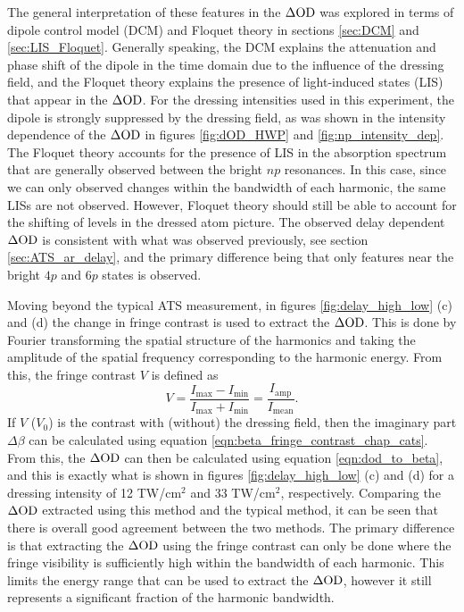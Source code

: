 The general interpretation of these features in the $\Delta\mathrm{OD}$ was explored in terms of dipole control model (DCM) and Floquet theory in sections \ref{sec:DCM} and \ref{sec:LIS_Floquet}.  Generally speaking, the DCM explains the attenuation and phase shift of the dipole in the time domain due to the influence of the dressing field, and the Floquet theory explains the presence of light-induced states (LIS) that appear in the $\Delta\mathrm{OD}$.  For the dressing intensities used in this experiment, the dipole is strongly suppressed by the dressing field, as was shown in the intensity dependence of the $\Delta\mathrm{OD}$ in figures \ref{fig:dOD_HWP} and \ref{fig:np_intensity_dep}.  The Floquet theory accounts for the presence of LIS in the absorption spectrum that are generally observed between the bright $np$ resonances.  In this case, since we can only observed changes within the bandwidth of each harmonic, the same LISs are not observed.  However, Floquet theory should still be able to account for the shifting of levels in the dressed atom picture.  The observed delay dependent $\Delta\mathrm{OD}$ is consistent with what was observed previously, see section \ref{sec:ATS_ar_delay}, and the primary difference being that only features near the bright $4p$ and $6p$ states is observed.

Moving beyond the typical ATS measurement, in figures \ref{fig:delay_high_low} (c) and (d) the change in fringe contrast is used to extract the $\Delta\mathrm{OD}$.  This is done by Fourier transforming the spatial structure of the harmonics and taking the amplitude of the spatial frequency corresponding to the harmonic energy.  From this, the fringe contrast $V$ is defined as
\begin{equation}
	V=\frac{I_{\mathrm{max}} - I_{\mathrm{min}}}{I_{\mathrm{max}} + I_{\mathrm{min}}} = \frac{I_{\mathrm{amp}}}{I_{\mathrm{mean}}}.
\end{equation}
If $V$ ($V_0$) is the contrast with (without) the dressing field, then the imaginary part $\Delta\beta$ can be calculated using equation \ref{eqn:beta_fringe_contrast_chap_cats}.  From this, the $\Delta\mathrm{OD}$ can then be calculated using equation \ref{eqn:dod_to_beta}, and this is exactly what is shown in figures \ref{fig:delay_high_low} (c) and (d) for a dressing intensity of 12 TW/cm$^2$ and 33 TW/cm$^2$, respectively.  Comparing the $\Delta\mathrm{OD}$ extracted using this method and the typical method, it can be seen that there is overall good agreement between the two methods.  The primary difference is that extracting the $\Delta\mathrm{OD}$ using the fringe contrast can only be done where the fringe visibility is sufficiently high within the bandwidth of each harmonic.  This limits the energy range that can be used to extract the $\Delta\mathrm{OD}$, however it still represents a significant fraction of the harmonic bandwidth.

